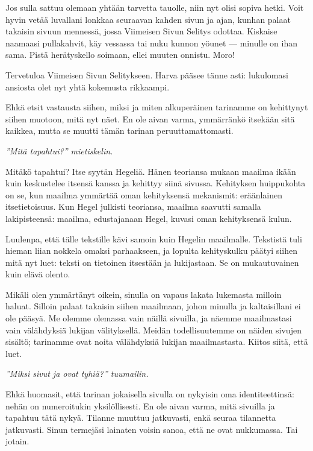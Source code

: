 \documentclass[a4paper, 12pt, finnish]{article}
\newcommand{\reader}[1]{\emph{#1}}
\newcommand{\q}[1]{''#1''}
\begin{document}
Jos sulla sattuu olemaan yhtään tarvetta tauolle,
niin nyt olisi sopiva hetki. Voit hyvin vetää luvallani
lonkkaa seuraavan kahden sivun \pageref{emptypage1} ja
\pageref{emptypage2} ajan, kunhan palaat takaisin sivuun
\pageref{intermissionreturn} mennessä, jossa Viimeisen
Sivun Selitys odottaa.
Kiskaise naamaasi pullakahvit, käy vessassa tai nuku kunnon
yöunet --- minulle on ihan sama. Pistä herätyskello soimaan,
ellei muuten onnistu.
Moro!


\newpage
\mbox{}\label{emptypage1}

\newpage
\mbox{}\label{emptypage2}

\newpage
\mbox{}\label{intermissionreturn}
Tervetuloa Viimeisen Sivun Selitykseen.
Harva pääsee tänne asti: lukulomasi ansiosta
olet nyt yhtä kokemusta rikkaampi.

Ehkä etsit vastausta siihen, miksi ja miten alkuperäinen
tarinamme on kehittynyt siihen muotoon, mitä nyt näet.
En ole aivan varma, ymmärränkö itsekään
sitä kaikkea, mutta se muutti tämän tarinan
peruuttamattomasti.

\reader{\q{Mitä tapahtui?} mietiskelin.}

Mitäkö tapahtui? Itse syytän Hegeliä. Hänen
teoriansa mukaan maailma ikään kuin keskustelee
itsensä kanssa ja kehittyy siinä sivussa.
Kehityksen huippukohta on se,
kun maailma ymmärtää oman kehityksensä mekanismit:
eräänlainen itsetietoisuus. Kun Hegel julkisti teoriansa,
maailma saavutti samalla lakipisteensä: maailma,
edustajanaan Hegel, kuvasi oman kehityksensä kulun.

Luulenpa, että tälle tekstille kävi samoin kuin Hegelin
maailmalle. Tekstistä tuli hieman liian nokkela
omaksi parhaakseen, ja lopulta kehityskulku päätyi
siihen mitä nyt luet: teksti on tietoinen itsestään
ja lukijastaan. Se on mukautuvainen kuin elävä olento.

Mikäli olen ymmärtänyt oikein, sinulla on vapaus lakata
lukemasta milloin haluat. Silloin palaat takaisin siihen
maailmaan, johon minulla ja kaltaisillani ei ole pääsyä.
Me olemme olemassa vain näillä sivuilla, ja näemme
maailmastasi vain välähdyksiä lukijan välityksellä.
Meidän todellisuutemme on näiden sivujen sisältö;
tarinamme ovat noita välähdyksiä lukijan maailmastasta.
Kiitos siitä, että luet.

\reader{\q{Miksi sivut \pageref{emptypage1} ja
\pageref{emptypage2} ovat tyhiä?} tuumailin.}

Ehkä huomasit, että tarinan jokaisella sivulla on
nykyisin oma identiteettinsä: nehän on numeroitukin
yksilöllisesti. En ole aivan varma, mitä
sivuilla \pageref{emptypage1} ja \pageref{emptypage2}
tapahtuu tätä nykyä. Tilanne muuttuu jatkuvasti,
enkä seuraa tilannetta jatkuvasti. Sinun termejäsi lainaten
voisin sanoa, että ne ovat nukkumassa. Tai jotain.
\end{document}
